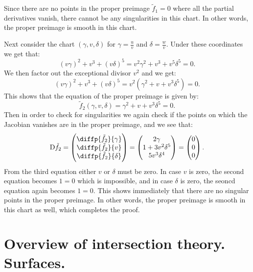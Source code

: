 \documentclass[11pt, a4paper]{article}
\begin{document}
\begin{solution}
  Since there are no points in the proper preimage $\tilde f_1 = 0$
  where all the partial derivatives vanish,
  there cannot be any singularities in this chart.
  In other words, the proper preimage is smooth in this chart.

  Next consider the chart $(\gamma,v,\delta)$ for $\gamma = \frac{u}{v}$
  and $\delta = \frac{w}{v}$.
  Under these coordinates we get that:
  \[
    (v \gamma)^2 + v^3 + (v \delta)^5 = 
    v^2 \gamma^2 + v^3 + v^5 \delta^5 =
    0.
  \]
  We then factor out the exceptional divisor $v^2$ and we get:
  \[
    (v \gamma)^2 + v^3 + (v \delta)^5 = 
    v^2 (\gamma^2 + v + v^3 \delta^5) = 0.
  \]
  This shows that the equation of the proper preimage is given by:
  \[
    \tilde f_2(\gamma,v,\delta) =
    \gamma^2 + v + v^3 \delta^5 = 0.
  \]
  Then in order to check for singularities we again check if the points
  on which the Jacobian vanishes are in the proper preimage,
  and we see that:
  \[
    \Dif \tilde f_2 =
    \begin{pmatrix}
      \diffp{{\tilde f_2}}{\gamma} \\
      \diffp{{\tilde f_2}}{v} \\
      \diffp{{\tilde f_2}}{\delta}
    \end{pmatrix} =
    \begin{pmatrix}
      2\gamma \\
      1 + 3v^2 \delta^5 \\
      5 v^3 \delta^4
    \end{pmatrix} =
    \begin{pmatrix}
      0 \\ 0 \\ 0
    \end{pmatrix}.
  \]
  From the third equation either $v$ or $\delta$ must be zero.
  In case $v$ is zero, the second equation becomes $1 = 0$
  which is impossible, and in case $\delta$ is zero,
  the seoncd equation again becomes $1 = 0$.
  This shows immediately that there are no singular points in the proper
  preimage.
  In other words, the proper preimage is smooth in this chart as well,
  which completes the proof.
\end{solution}

\newpage

\section{Overview of intersection theory. Surfaces.}
\end{document}
